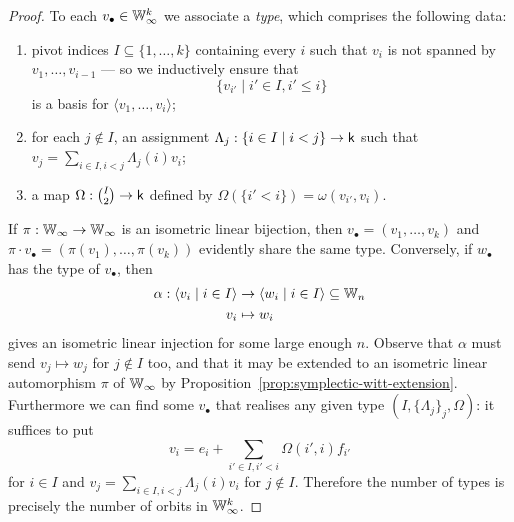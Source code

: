 \begin{proof}
    To each $v_\bullet \in \mathbb{W}_\infty^k$ we associate a \emph{type}, 
    which comprises the following data:
    \begin{enumerate}
        \item 
        pivot indices $I \subseteq \{1, \ldots, k\}$ containing every $i$ 
        such that $v_i$ is not spanned by $v_1, \ldots, v_{i-1}$
        --- so we inductively ensure that $$\{v_{i'} \mid i' \in I, i' \leq i\}$$ is a basis for $\langle v_1, \ldots, v_i \rangle$;

        \item 
        for each $j \not\in I$, an assignment $\Lambda_j : \{i \in I \mid i < j\} \to \mathsf{k}$
        such that $v_j = \sum_{i \in I, i < j} \Lambda_j(i) v_i$;

        \item 
        a map $\Omega : \binom{I}{2} \to \mathsf{k}$ defined by $\Omega(\{i' < i\}) = \omega(v_{i'}, v_{i})$.
    \end{enumerate}
    If $\pi : \mathbb{W}_\infty \to \mathbb{W}_\infty$ is an isometric linear bijection,
    then $v_\bullet = (v_1, \ldots, v_k)$ and $\pi \cdot v_\bullet = (\pi(v_1), \ldots, \pi(v_k))$ evidently share the same type.
    Conversely, if $w_\bullet$ has the type of $v_\bullet$,
    then
    \begin{align*}
        \alpha : \langle v_i \mid i \in I \rangle 
        &\to \langle w_i \mid i \in I \rangle 
        \subseteq \mathbb{W}_n \\
        v_i &\mapsto w_i
    \end{align*}
    gives an isometric linear injection for some large enough $n$.
    Observe that $\alpha$ must send $v_j \mapsto w_j$ for $j \not\in I$ too,
    and that it may be extended to an isometric linear automorphism $\pi$ of $\mathbb{W}_\infty$ by Proposition~\ref{prop:symplectic-witt-extension}.
    Furthermore we can find some $v_\bullet$ that realises any given type $(I, \{\Lambda_j\}_j, \Omega)$:
    it suffices to put
    \[
        v_i = e_i + \sum_{i' \in I, i' < i} \Omega(i', i) f_{i'}
    \]
    for $i \in I$ and $v_j = \sum_{i \in I, i < j} \Lambda_j(i) v_i$ for $j \not\in I$.
    Therefore the number of types is precisely the number of orbits in $\mathbb{W}_\infty^k$.


\end{proof}
